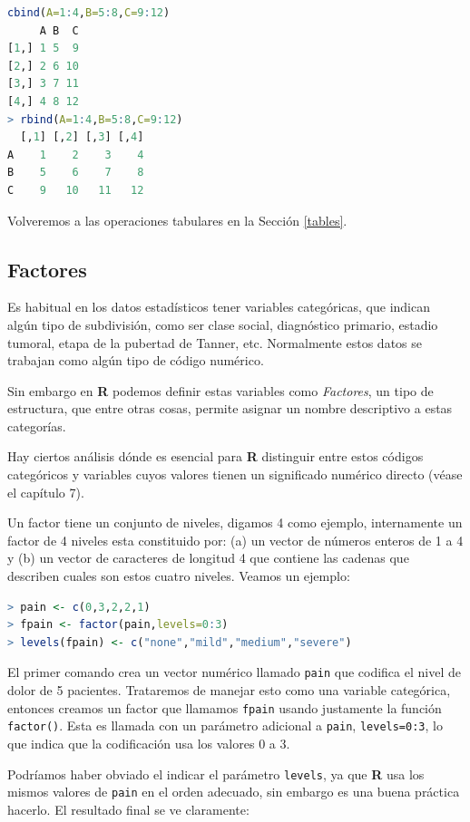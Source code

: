\documentclass[spanish]{extbook}
\numberwithin{equation}{section}
\numberwithin{figure}{section}
\begin{document}
\begin{lstlisting}[language=R]
cbind(A=1:4,B=5:8,C=9:12)
     A B  C
[1,] 1 5  9
[2,] 2 6 10
[3,] 3 7 11
[4,] 4 8 12
> rbind(A=1:4,B=5:8,C=9:12)
  [,1] [,2] [,3] [,4]
A    1    2    3    4
B    5    6    7    8
C    9   10   11   12
\end{lstlisting}

Volveremos a las operaciones tabulares en la Sección \ref{tables}.

\subsection{Factores}

Es habitual en los datos estadísticos tener variables categóricas, que indican
algún tipo de subdivisión, como ser clase social, diagnóstico primario, estadio
tumoral, etapa de la pubertad de Tanner, etc. Normalmente estos datos se
trabajan como algún tipo de código numérico. 

Sin embargo en \textbf{R} podemos definir estas variables como
\textit{Factores}, un tipo de estructura, que entre otras cosas, permite
asignar un nombre descriptivo a estas categorías.  

Hay ciertos análisis dónde es esencial para \textbf{R} distinguir
entre estos códigos categóricos y variables cuyos valores tienen un significado
numérico directo (véase el capítulo 7). 

Un factor tiene un conjunto de niveles, digamos 4 como ejemplo, internamente un
factor de 4 niveles esta constituido por: (a) un vector de números enteros de 1
a 4 y (b) un vector de caracteres de longitud 4 que contiene las cadenas que
describen cuales son estos cuatro niveles. Veamos un ejemplo:

\begin{lstlisting}[language=R]
> pain <- c(0,3,2,2,1)
> fpain <- factor(pain,levels=0:3)
> levels(fpain) <- c("none","mild","medium","severe")
\end{lstlisting}

El primer comando crea un vector numérico llamado \texttt{pain} que codifica el
nivel de dolor de 5 pacientes. Trataremos de manejar esto como una variable
categórica, entonces creamos un factor que llamamos \texttt{fpain} usando
justamente la función \texttt{factor()}. Esta es llamada con un parámetro
adicional a \texttt{pain}, \texttt{levels=0:3}, lo que indica que la
codificación usa los valores 0 a 3.

Podríamos haber obviado el indicar el parámetro \texttt{levels}, ya que \textbf{R} usa
los mismos valores de \texttt{pain} en el orden adecuado, sin embargo es una buena
práctica hacerlo. El resultado final se ve claramente:
\end{document}

